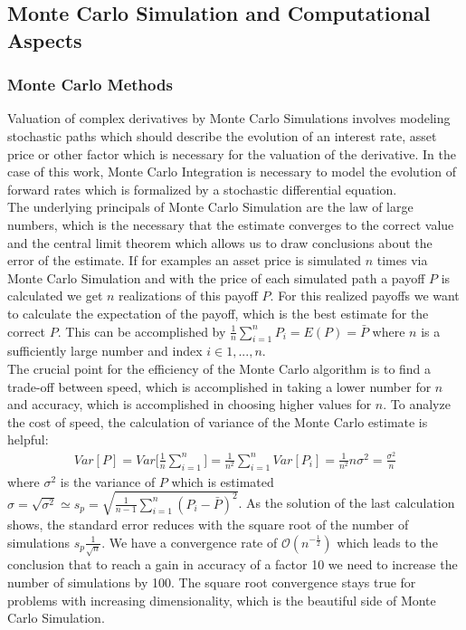 \documentclass[11pt]{article}
\numberwithin{equation}{subsection}
\begin{document}
\subsection{Monte Carlo Simulation and Computational Aspects}
\subsubsection{Monte Carlo Methods}
Valuation of complex derivatives by Monte Carlo Simulations involves modeling stochastic paths which should describe the evolution of an interest rate, asset price or other factor which is necessary for the valuation of the derivative. In the case of this work, Monte Carlo Integration is necessary to model the evolution of forward rates which is formalized by a stochastic differential equation.\\
The underlying principals of Monte Carlo Simulation are the law of large numbers, which is the necessary that the estimate converges to the correct value and the central limit theorem which allows us to draw conclusions about the error of the estimate. If for examples an asset price is simulated \(n\) times via Monte Carlo Simulation and with the price of each simulated path a payoff \(P\) is calculated we get \(n\) realizations of this payoff \(P\). For this realized payoffs we want to calculate the expectation of the payoff, which is the best estimate for the correct \(P\). This can be accomplished by \(\frac{1}{n}\sum_{i=1}^{n} P_i = E(P) = \bar{P}\) where \(n\) is a sufficiently large number and index \(i \in 1,...,n\).\\
The crucial point for the efficiency of the Monte Carlo algorithm is to find a trade-off between speed, which is accomplished in taking a lower number for \(n\) and accuracy, which is accomplished in choosing higher values for \(n\). To analyze the cost of speed, the calculation of variance of the Monte Carlo estimate is helpful:
\begin{eqnarray*}
	Var[P] = Var\bigg[\frac{1}{n}\sum_{i=1}^{n}\bigg] = \frac{1}{n^2}\sum_{i=1}^{n}Var[P_i] = \frac{1}{n^2} n\sigma^2 = \frac{\sigma^2}{n}
\end{eqnarray*}
where \(\sigma^2\) is the variance of \(P\) which is estimated \(\sigma = \sqrt{\sigma^2} \simeq s_p = \sqrt{\frac{1}{n-1}\sum_{i=1}^{n}(P_i-\bar{P})^2}\).
As the solution of the last calculation shows, the standard error reduces with the square root of the number of simulations \(s_p \frac{1}{\sqrt{n}}\). We have a convergence rate of \(\mathcal{O}(n^{-\frac{1}{2}})\) which leads to the conclusion that to reach a gain in accuracy of a factor 10 we need to increase the number of simulations by 100. The square root convergence stays true for problems with increasing dimensionality, which is the beautiful side of Monte Carlo Simulation.
\end{document}
